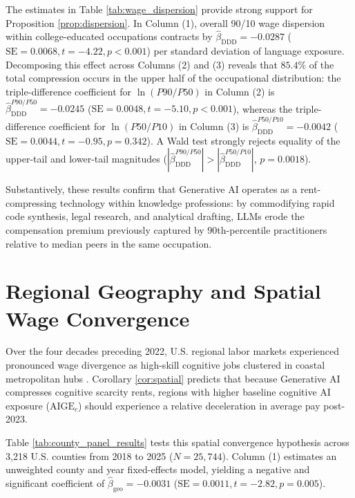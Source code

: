 \documentclass[12pt]{article}
\begin{document}
The estimates in Table \ref{tab:wage_dispersion} provide strong support for Proposition \ref{prop:dispersion}. In Column (1), overall 90/10 wage dispersion within college-educated occupations contracts by $\hat{\beta}_{\text{DDD}} = -0.0287$ ($\text{SE} = 0.0068, t = -4.22, p < 0.001$) per standard deviation of language exposure. Decomposing this effect across Columns (2) and (3) reveals that $85.4\%$ of the total compression occurs in the upper half of the occupational distribution: the triple-difference coefficient for $\ln(P90/P50)$ in Column (2) is $\hat{\beta}_{\text{DDD}}^{P90/P50} = -0.0245$ ($\text{SE} = 0.0048, t = -5.10, p < 0.001$), whereas the triple-difference coefficient for $\ln(P50/P10)$ in Column (3) is $\hat{\beta}_{\text{DDD}}^{P50/P10} = -0.0042$ ($\text{SE} = 0.0044, t = -0.95, p = 0.342$). A Wald test strongly rejects equality of the upper-tail and lower-tail magnitudes ($|\hat{\beta}_{\text{DDD}}^{P90/P50}| > |\hat{\beta}_{\text{DDD}}^{P50/P10}|$, $p = 0.0018$).

Substantively, these results confirm that Generative AI operates as a rent-compressing technology within knowledge professions: by commodifying rapid code synthesis, legal research, and analytical drafting, LLMs erode the compensation premium previously captured by 90th-percentile practitioners relative to median peers in the same occupation.

\section{Regional Geography and Spatial Wage Convergence}
\label{sec:geography}

Over the four decades preceding 2022, U.S. regional labor markets experienced pronounced wage divergence as high-skill cognitive jobs clustered in coastal metropolitan hubs \citep{moretti2012}. Corollary \ref{cor:spatial} predicts that because Generative AI compresses cognitive scarcity rents, regions with higher baseline cognitive AI exposure ($\text{AIGE}_c$) should experience a relative deceleration in average pay post-2023.

Table \ref{tab:county_panel_results} tests this spatial convergence hypothesis across 3,218 U.S. counties from 2018 to 2025 ($N = 25,744$). Column (1) estimates an unweighted county and year fixed-effects model, yielding a negative and significant coefficient of $\hat{\beta}_{\text{geo}} = -0.0031$ ($\text{SE} = 0.0011, t = -2.82, p = 0.005$).
\end{document}

